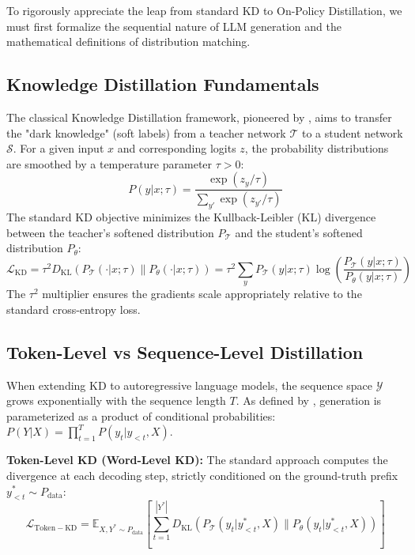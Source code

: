 \documentclass{article}
\newcommand{\E}{\mathbb{E}}
\newcommand{\KL}{D_{\mathrm{KL}}}
\newcommand{\ptheta}{P_\theta}
\newcommand{\pteacher}{P_{\mathcal{T}}}
\newcommand{\pdata}{P_{\mathrm{data}}}
\newcommand{\loss}{\mathcal{L}}
\begin{document}
To rigorously appreciate the leap from standard KD to On-Policy Distillation, we must first formalize the sequential nature of LLM generation and the mathematical definitions of distribution matching.

\subsection{Knowledge Distillation Fundamentals}
The classical Knowledge Distillation framework, pioneered by \cite{hinton2015distilling}, aims to transfer the "dark knowledge" (soft labels) from a teacher network $\mathcal{T}$ to a student network $\mathcal{S}$. For a given input $x$ and corresponding logits $z$, the probability distributions are smoothed by a temperature parameter $\tau > 0$:
\begin{equation}
    P(y|x; \tau) = \frac{\exp(z_y / \tau)}{\sum_{y'} \exp(z_{y'} / \tau)}
\end{equation}
The standard KD objective minimizes the Kullback-Leibler (KL) divergence between the teacher's softened distribution $\pteacher$ and the student's softened distribution $\ptheta$:
\begin{equation}
    \loss_{\mathrm{KD}} = \tau^2 \KL(\pteacher(\cdot|x; \tau) \parallel \ptheta(\cdot|x; \tau)) = \tau^2 \sum_{y} \pteacher(y|x; \tau) \log \left( \frac{\pteacher(y|x; \tau)}{\ptheta(y|x; \tau)} \right)
\end{equation}
The $\tau^2$ multiplier ensures the gradients scale appropriately relative to the standard cross-entropy loss.

\subsection{Token-Level vs Sequence-Level Distillation}
When extending KD to autoregressive language models, the sequence space $\mathcal{Y}$ grows exponentially with the sequence length $T$. As defined by \cite{kim2016sequence}, generation is parameterized as a product of conditional probabilities: $P(Y|X) = \prod_{t=1}^T P(y_t | y_{<t}, X)$.

\textbf{Token-Level KD (Word-Level KD):} The standard approach computes the divergence at each decoding step, strictly conditioned on the ground-truth prefix $y_{<t}^* \sim \pdata$:
\begin{equation}
    \loss_{\mathrm{Token-KD}} = \E_{X, Y^* \sim \pdata} \left[ \sum_{t=1}^{|Y^*|} \KL \left( \pteacher(y_t | y_{<t}^*, X) \parallel \ptheta(y_t | y_{<t}^*, X) \right) \right]
    \label{eq:token_kd}
\end{equation}
\end{document}
